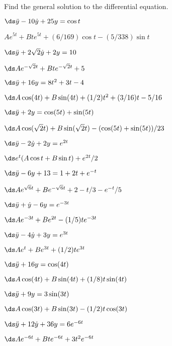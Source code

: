 \begin{exercises}

Find the general solution to the differential equation.

\exer $\ds\ddot y -10\dot y+25y=\cos t$
\begin{answer} $Ae^{5t}+Bte^{5t}+(6/169)\cos t-(5/338)\sin t$
\end{answer}

\exer $\ds\ddot y+2\sqrt2\dot y+2y=10$
\begin{answer} $\ds Ae^{-\sqrt2t}+Bte^{-\sqrt2t}+5$
\end{answer}

\exer $\ds\ddot y+16y=8t^2+3t-4$
\begin{answer} $\ds A\cos(4t)+B\sin(4t)+ (1/2)t^2+(3/16)t-5/16$
\end{answer}

\exer $\ds\ddot y+2y=\cos(5t)+\sin(5t)$
\begin{answer} $\ds A\cos(\sqrt2t)+B\sin(\sqrt2t)-(\cos(5t)+\sin(5t))/23$
\end{answer}

\exer $\ds\ddot y-2\dot y+2y=e^{2t}$
\begin{answer} $\ds e^{t}(A\cos t+B\sin t)+e^{2t}/2$
\end{answer}

\exer $\ds\ddot y-6y+13=1+2t+e^{-t}$
\begin{answer} $\ds Ae^{\sqrt6t}+Be^{-\sqrt6t}+2-t/3-e^{-t}/5$
\end{answer}

\exer $\ds\ddot y+\dot y-6y=e^{-3t}$
\begin{answer} $\ds Ae^{-3t}+Be^{2t}-(1/5)te^{-3t}$
\end{answer}

\exer $\ds\ddot y-4\dot y+3y=e^{3t}$
\begin{answer} $\ds Ae^t+Be^{3t}+(1/2)te^{3t}$
\end{answer}

\exer $\ds\ddot y+16y=\cos(4t)$
\begin{answer} $\ds A\cos(4t)+B\sin(4t)+(1/8)t\sin(4t)$
\end{answer}

\exer $\ds\ddot y +9y=3\sin(3t)$
\begin{answer} $\ds A\cos(3t)+B\sin(3t)-(1/2)t\cos(3t)$
\end{answer}

\exer $\ds\ddot y+12\dot y+36y=6e^{-6t}$
\begin{answer} $\ds Ae^{-6t}+Bte^{-6t}+3t^2e^{-6t}$
\end{answer}


\end{exercises}
